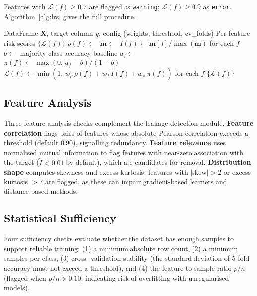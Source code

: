 \documentclass[12pt,a4paper]{report}
\begin{document}
Features with $\mathcal{L}(f) \ge 0.7$ are flagged as \texttt{warning};
$\mathcal{L}(f) \ge 0.9$ as \texttt{error}.  Algorithm~\ref{alg:lrs} gives the
full procedure.

\begin{algorithm}[!ht]
\caption{Unified Leakage Risk Score computation.}
\label{alg:lrs}
\begin{algorithmic}[1]
\Require DataFrame $\mathbf{X}$, target column $y$, config (weights, threshold, cv\_folds)
\Ensure Per-feature risk scores $\{\mathcal{L}(f)\}$
  \State $\rho(f) \leftarrow$ 
\EndFor
\State $\mathbf{m} \leftarrow$ 
\State $\tilde{I}(f) \leftarrow \mathbf{m}[f] / \max(\mathbf{m})$ for each $f$
\State $b \leftarrow$ majority-class accuracy baseline
  \State $a_f \leftarrow$ 
  \State $\pi(f) \leftarrow \max(0,\ a_f - b) / (1 - b)$
\EndFor
\State $\mathcal{L}(f) \leftarrow \min(1,\ w_\rho\,\rho(f) + w_I\,\tilde{I}(f) + w_\pi\,\pi(f))$ for each $f$
\State \Return $\{\mathcal{L}(f)\}$
\end{algorithmic}
\end{algorithm}

\subsection{Feature Analysis}

Three feature analysis checks complement the leakage detection module.  \textbf{Feature
correlation} flags pairs of features whose absolute Pearson correlation exceeds a threshold
(default 0.90), signalling redundancy.  \textbf{Feature relevance} uses normalised mutual
information to flag features with near-zero association with the target ($\tilde{I}<0.01$
by default), which are candidates for removal.  \textbf{Distribution shape} computes
skewness and excess kurtosis; features with $|\text{skew}|>2$ or excess kurtosis $>7$
are flagged, as these can impair gradient-based learners and distance-based methods.

\subsection{Statistical Sufficiency}

Four sufficiency checks evaluate whether the dataset has enough samples to support reliable
training: (1) a minimum absolute row count, (2) a minimum samples per class, (3) cross-
validation stability (the standard deviation of 5-fold accuracy must not exceed a threshold),
and (4) the feature-to-sample ratio $p/n$ (flagged when $p/n>0.10$, indicating risk of
overfitting with unregularised models).
\end{document}
